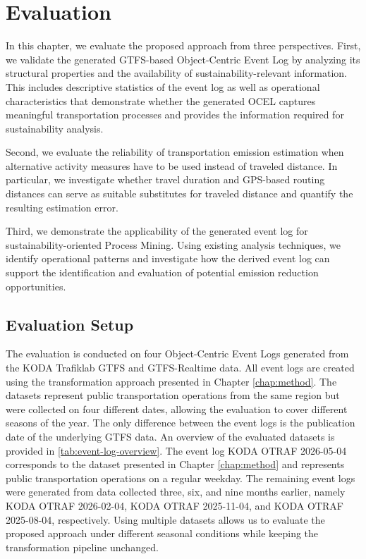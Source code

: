 \clearpage
\par
\normalfont
\normalsize
\justifying
\chapter{Evaluation}
\label{chap:eval}

In this chapter, we evaluate the proposed approach from three perspectives. First, we validate the generated GTFS-based Object-Centric Event Log by analyzing its structural properties and the availability of sustainability-relevant information. This includes descriptive statistics of the event log as well as operational characteristics that demonstrate whether the generated OCEL captures meaningful transportation processes and provides the information required for sustainability analysis.

Second, we evaluate the reliability of transportation emission estimation when alternative activity measures have to be used instead of traveled distance. In particular, we investigate whether travel duration and GPS-based routing distances can serve as suitable substitutes for traveled distance and quantify the resulting estimation error.

Third, we demonstrate the applicability of the generated event log for sustainability-oriented Process Mining. Using existing analysis techniques, we identify operational patterns and investigate how the derived event log can support the identification and evaluation of potential emission reduction opportunities.



\section{Evaluation Setup}
The evaluation is conducted on four Object-Centric Event Logs generated from the KODA Trafiklab GTFS and GTFS-Realtime data. All event logs are created using the transformation approach presented in Chapter \ref{chap:method}. The datasets represent public transportation operations from the same region but were collected on four different dates, allowing the evaluation to cover different seasons of the year. The only difference between the event logs is the publication date of the underlying GTFS data. An overview of the evaluated datasets is provided in \autoref{tab:event-log-overview}.
The event log KODA OTRAF 2026-05-04 corresponds to the dataset presented in Chapter \ref{chap:method} and represents public transportation operations on a regular weekday. The remaining event logs were generated from data collected three, six, and nine months earlier, namely KODA OTRAF 2026-02-04, KODA OTRAF 2025-11-04, and KODA OTRAF 2025-08-04, respectively. Using multiple datasets allows us to evaluate the proposed approach under different seasonal conditions while keeping the transformation pipeline unchanged.

